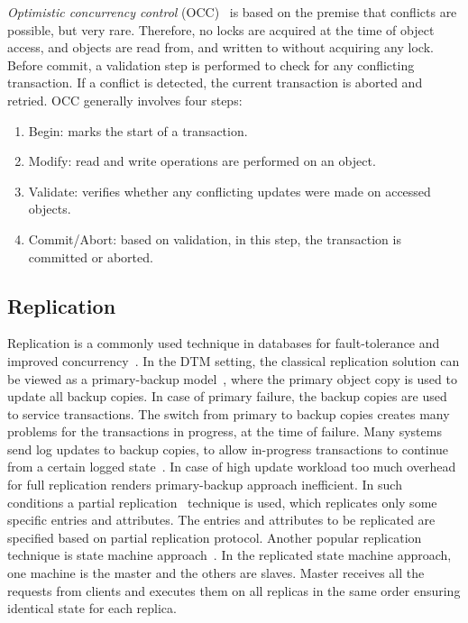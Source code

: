 \documentclass[12pt,english]{report}
\begin{document}
\textit{Optimistic concurrency control} (OCC)~\cite{OptCon:Herlihy:1990:AVA:77643.77647} is based on the premise that conflicts are possible, but very rare. Therefore, no locks are acquired at the time of object access, and objects are read from, and written to without acquiring any lock. Before commit, a validation step is performed to check for any conflicting transaction. If a conflict is detected, the current transaction is aborted and retried. OCC generally involves  four steps:
\begin{enumerate}
\item Begin: marks the start of a transaction.
\item Modify: read and write operations are performed on an object.
\item Validate: verifies whether any conflicting updates were made on accessed objects.
\item Commit/Abort: based on validation, in this step, the transaction is committed or aborted.
\end{enumerate}   


\subsection{Replication}

Replication is a commonly used technique in databases for fault-tolerance and improved concurrency~\cite{faultReplic:1022297}. 
In the DTM setting, the classical replication solution can be viewed as a primary-backup model~\cite{budhiraja1993primary, goldring1994discussion}, where the primary object copy is used to update all backup copies. 
In case of primary failure, the backup copies are used to service transactions. The switch from primary to backup copies creates many problems for the transactions in progress, at the time of failure. Many systems send log updates to backup copies, to allow in-progress transactions to continue from a certain logged state~\cite{ImpData840959}. In case of high update workload too much overhead for full replication renders primary-backup approach inefficient. In such conditions a partial replication~\cite{alonso1997partial} technique is used, which  replicates only some specific entries and attributes. The entries and attributes to be replicated are specified based on partial replication protocol. Another popular replication technique is state machine approach~\cite{Schneider93chapter7}. In the replicated state machine approach, one machine is the master and the others are slaves. Master receives all the requests from clients and executes them on all replicas in the same order ensuring identical state for each replica.
\end{document}

